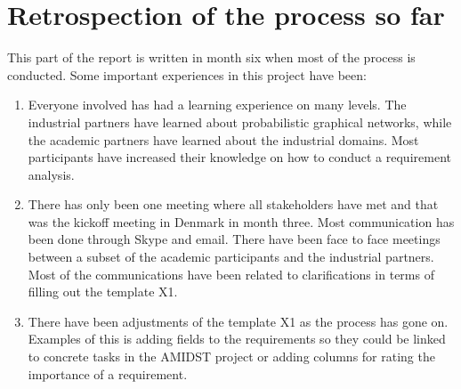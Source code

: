 \documentclass[11pt, oneside]{article}   	%
\begin{document}
\section{Retrospection of the process so far}
\label{sec:retrospection}

This part of the report is written in month six when most of the process is conducted.  Some important experiences in this project have been:

\begin{enumerate}
\item Everyone involved has had a learning experience on many levels.  The industrial partners have learned about probabilistic graphical networks, while the academic partners have learned about the industrial domains.  Most participants have increased their knowledge on how to conduct a requirement analysis. 
\item There has only been one meeting where all stakeholders have met and that was the kickoff meeting in Denmark in month three.  Most communication has been done through Skype and email.  There have been face to face meetings between a subset of the academic participants and the industrial partners. Most of the communications have been related to clarifications in terms of filling out the template X1.
\item There have been adjustments of the template X1 as the process has gone on.  Examples of this is adding fields to the requirements so they could be linked to concrete tasks in the AMIDST project or adding columns for rating the importance of a requirement.
\end{enumerate}





\end{document}
